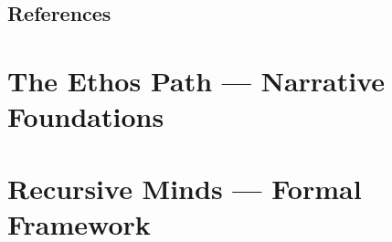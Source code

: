 \documentclass{book}       %
\begin{document}
\chapter{References}



\part{The Ethos Path — Narrative Foundations}

\part{Recursive Minds — Formal Framework}


\backmatter



\printglossary
\end{document}
